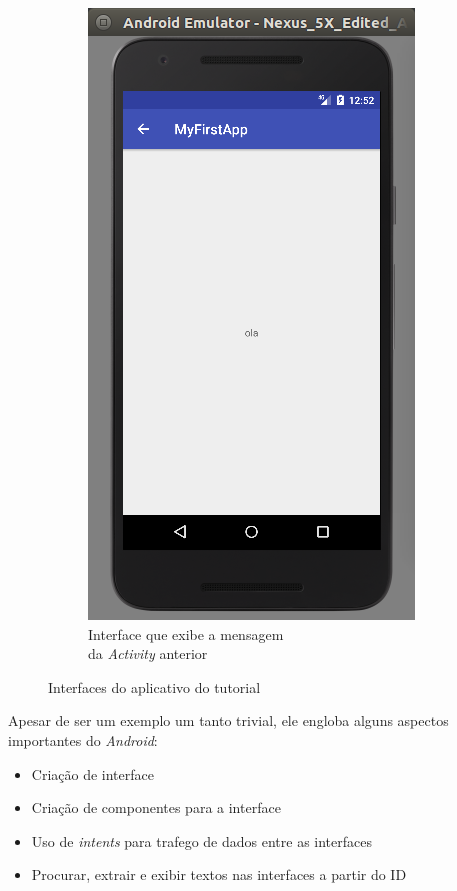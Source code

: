 \documentclass[hidelinks,12pt]{article}
\begin{document}
\begin{figure}[H]
\begin{subfigure}{0.5\textwidth}
		\includegraphics[scale=0.5]{hw_result}
		\caption{Interface que exibe a mensagem\\\hspace{\textwidth}da \textit{Activity} anterior\\\hspace{\textwidth}}
		\label{hw_result}
	\end{subfigure}
	\caption{Interfaces do aplicativo do tutorial}
	\label{hw}
\end{figure}

Apesar de ser um exemplo um tanto trivial, ele engloba alguns aspectos importantes do \textit{Android}:
\begin{itemize}
	\item Cria\c{c}\~ao de interface
	\item Cria\c{c}\~ao de componentes para a interface
	\item Uso de \textit{intents} para trafego de dados entre as interfaces
	\item Procurar, extrair e exibir textos nas interfaces a partir do ID
\end{itemize}
\end{document}
